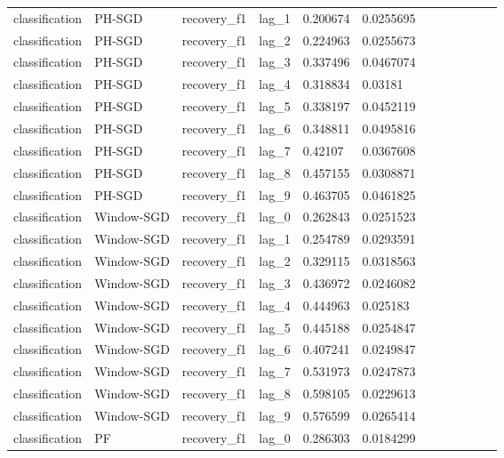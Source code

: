 \begin{tabular}{llllllllllll}
classification & PH-SGD & recovery\_f1 & lag\_1 & 0.200674 & 0.0255695 &  &  &  &  &  &  \\
classification & PH-SGD & recovery\_f1 & lag\_2 & 0.224963 & 0.0255673 &  &  &  &  &  &  \\
classification & PH-SGD & recovery\_f1 & lag\_3 & 0.337496 & 0.0467074 &  &  &  &  &  &  \\
classification & PH-SGD & recovery\_f1 & lag\_4 & 0.318834 & 0.03181 &  &  &  &  &  &  \\
classification & PH-SGD & recovery\_f1 & lag\_5 & 0.338197 & 0.0452119 &  &  &  &  &  &  \\
classification & PH-SGD & recovery\_f1 & lag\_6 & 0.348811 & 0.0495816 &  &  &  &  &  &  \\
classification & PH-SGD & recovery\_f1 & lag\_7 & 0.42107 & 0.0367608 &  &  &  &  &  &  \\
classification & PH-SGD & recovery\_f1 & lag\_8 & 0.457155 & 0.0308871 &  &  &  &  &  &  \\
classification & PH-SGD & recovery\_f1 & lag\_9 & 0.463705 & 0.0461825 &  &  &  &  &  &  \\
classification & Window-SGD & recovery\_f1 & lag\_0 & 0.262843 & 0.0251523 &  &  &  &  &  &  \\
classification & Window-SGD & recovery\_f1 & lag\_1 & 0.254789 & 0.0293591 &  &  &  &  &  &  \\
classification & Window-SGD & recovery\_f1 & lag\_2 & 0.329115 & 0.0318563 &  &  &  &  &  &  \\
classification & Window-SGD & recovery\_f1 & lag\_3 & 0.436972 & 0.0246082 &  &  &  &  &  &  \\
classification & Window-SGD & recovery\_f1 & lag\_4 & 0.444963 & 0.025183 &  &  &  &  &  &  \\
classification & Window-SGD & recovery\_f1 & lag\_5 & 0.445188 & 0.0254847 &  &  &  &  &  &  \\
classification & Window-SGD & recovery\_f1 & lag\_6 & 0.407241 & 0.0249847 &  &  &  &  &  &  \\
classification & Window-SGD & recovery\_f1 & lag\_7 & 0.531973 & 0.0247873 &  &  &  &  &  &  \\
classification & Window-SGD & recovery\_f1 & lag\_8 & 0.598105 & 0.0229613 &  &  &  &  &  &  \\
classification & Window-SGD & recovery\_f1 & lag\_9 & 0.576599 & 0.0265414 &  &  &  &  &  &  \\
classification & PF & recovery\_f1 & lag\_0 & 0.286303 & 0.0184299 &  &  &  &  &  &  \\

\end{tabular}
